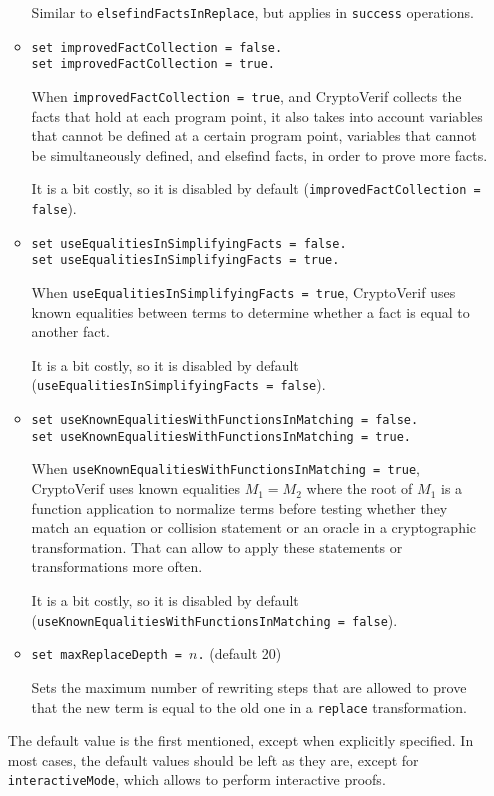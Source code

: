 \begin{itemize}
\begin{itemize}
Similar to \texttt{elsefindFactsInReplace}, but applies in
\texttt{success} operations. 

\item \texttt{set improvedFactCollection = false.}\\
\texttt{set improvedFactCollection = true.}

When \texttt{improvedFactCollection = true}, and CryptoVerif collects
the facts that hold at each program point, it also takes into account
variables that cannot be defined at a certain program point, variables
that cannot be simultaneously defined, and elsefind facts, in order to
prove more facts.

It is a bit costly, so it is disabled by default
(\texttt{improvedFactCollection = false}).

\item \texttt{set useEqualitiesInSimplifyingFacts = false.}\\
\texttt{set useEqualitiesInSimplifyingFacts = true.}

When \texttt{useEqualitiesInSimplifyingFacts = true}, CryptoVerif
uses known equalities between terms to determine whether a fact
is equal to another fact.

It is a bit costly, so it is disabled by default
(\texttt{useEqualitiesInSimplifyingFacts = false}).

\item \texttt{set useKnownEqualitiesWithFunctionsInMatching = false.}\\
\texttt{set useKnownEqualitiesWithFunctionsInMatching = true.}

When \texttt{useKnownEqualitiesWithFunctionsInMatching = true}, CryptoVerif
uses known equalities $M_1 = M_2$ where the root of $M_1$ is a function 
application to normalize terms before testing whether they match
an equation or collision statement or an oracle in a cryptographic
transformation. That can allow to apply these statements or transformations
more often.

It is a bit costly, so it is disabled by default
(\texttt{useKnownEqualitiesWithFunctionsInMatching = false}).

\item \texttt{set maxReplaceDepth = $n$.} (default 20)

Sets the maximum number of rewriting steps that are allowed 
to prove that the new term is equal to the old one in a 
\texttt{replace} transformation. 

\end{itemize}
The default value is the first mentioned, except when explicitly specified.
In most cases, the default values should be left as they are, except
for {\tt interactiveMode}, which allows to perform 
interactive proofs.


\end{itemize}
